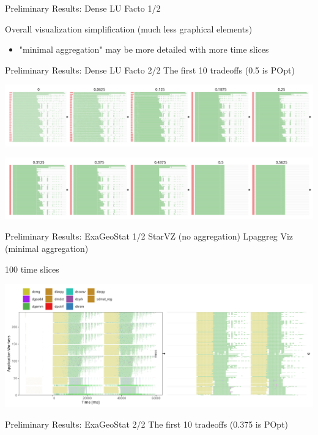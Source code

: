 \documentclass[12pt,xcolor=dvipsnames,presentation,aspectratio=169]{beamer}
\begin{document}
{\begin{frame}[label={sec:org2205751}]{Preliminary Results: Dense LU Facto 1/2}
\vfill\pause

Overall visualization simplification (much less graphical elements)
\begin{itemize}
\item "minimal aggregation" may be more detailed with more time slices
\end{itemize}
\end{frame}
\begin{frame}[label={sec:org12c4b37}]{Preliminary Results: Dense LU Facto 2/2}
The first 10 tradeoffs (0.5 is POpt)

\begin{center}
\includegraphics[width=\linewidth]{./2w+dif_5p_line1.png}
\end{center}

\begin{center}
\includegraphics[width=\linewidth]{./2w+dif_5p_line2.png}
\end{center}
\end{frame}
\begin{frame}[label={sec:orgef746a3}]{Preliminary Results: ExaGeoStat 1/2}
StarVZ (no aggregation)  \hfill  Lpaggreg Viz (minimal aggregation)

 \hfill 100 time slices

\begin{center}
\includegraphics[width=\linewidth]{./exageo_p-0.png}
\end{center}
\end{frame}
\begin{frame}[label={sec:org15cf370}]{Preliminary Results: ExaGeoStat 2/2}
The first 10 tradeoffs (0.375 is POpt)


\end{frame}}
\end{document}
